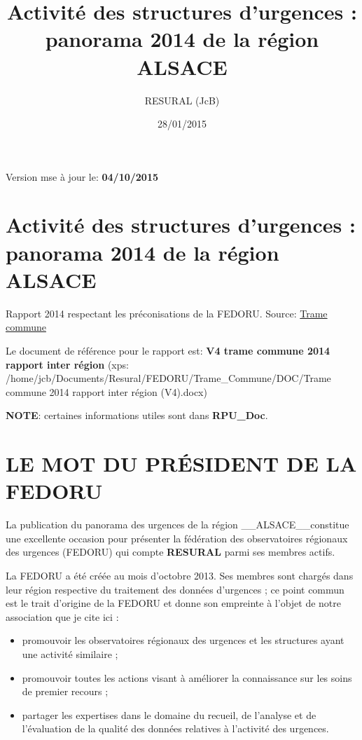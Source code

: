 \documentclass[]{article}
\title{Activité des structures d'urgences : panorama 2014 de la région ALSACE}
\author{RESURAL (JcB)}
\date{28/01/2015}
\begin{document}
\maketitle


{
\hypersetup{linkcolor=black}
\setcounter{tocdepth}{3}
\tableofcontents
}
Version mse à jour le: \textbf{04/10/2015}

\section{Activité des structures d'urgences : panorama 2014 de la région
ALSACE}\label{activite-des-structures-durgences-panorama-2014-de-la-region-alsace}

Rapport 2014 respectant les préconisations de la FEDORU. Source:
\href{https://docs.google.com/document/d/101LYVqVLeHZnrujfMm3aqBYfbOwx3CPEB3Y-Lbud2Ls/edit}{Trame
commune}

Le document de référence pour le rapport est: \textbf{V4 trame commune
2014 rapport inter région} (xps:
/home/jcb/Documents/Resural/FEDORU/Trame\_Commune/DOC/Trame commune 2014
rapport inter région (V4).docx)

\textbf{NOTE}: certaines informations utiles sont dans
\textbf{RPU\_Doc}.

\section{LE MOT DU PRÉSIDENT DE LA
FEDORU}\label{le-mot-du-president-de-la-fedoru}

La publication du panorama des urgences de la région
\_\_ALSACE\_\_constitue une excellente occasion pour présenter la
fédération des observatoires régionaux des urgences (FEDORU) qui compte
\textbf{RESURAL} parmi ses membres actifs.

La FEDORU a été créée au mois d'octobre 2013. Ses membres sont chargés
dans leur région respective du traitement des données d'urgences ; ce
point commun est le trait d'origine de la FEDORU et donne son empreinte
à l'objet de notre association que je cite ici :

\begin{itemize}
\itemsep1pt\parskip0pt
\item
  promouvoir les observatoires régionaux des urgences et les structures
  ayant une activité similaire ;
\item
  promouvoir toutes les actions visant à améliorer la connaissance sur
  les soins de premier recours ;
\item
  partager les expertises dans le domaine du recueil, de l'analyse et de
  l'évaluation de la qualité des données relatives à l'activité des
  urgences.
\end{itemize}
\end{document}

